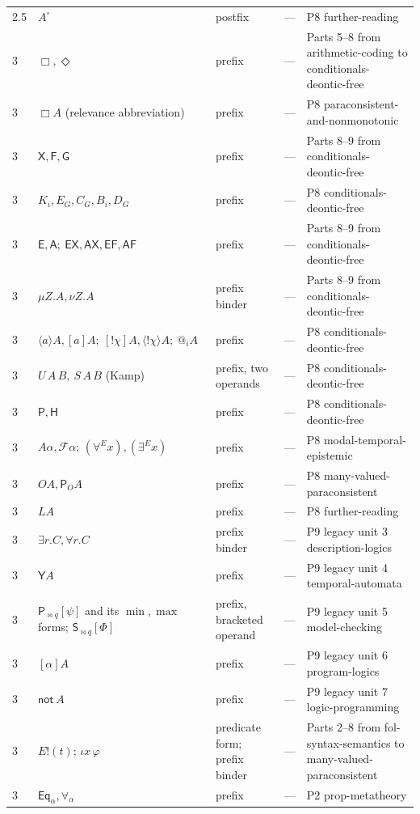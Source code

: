 \begin{longtable}{@{}p{}p{}p{}p{}p{}@{}}
2.5 & \(A^\circ\) & postfix & --- & P8 further-reading \\
3 & \(\Box,\Diamond\) & prefix & --- & Parts 5--8 from arithmetic-coding to conditionals-deontic-free \\
3 & \(\Box A\) (relevance abbreviation) & prefix & --- & P8 paraconsistent-and-nonmonotonic \\
3 & \(\mathsf X,\mathsf F,\mathsf G\) & prefix & --- & Parts 8--9 from conditionals-deontic-free \\
3 & \(K_i,E_G,C_G,B_i,D_G\) & prefix & --- & P8 conditionals-deontic-free \\
3 & \(\mathsf E,\mathsf A;\ \mathsf{EX},\mathsf{AX},\mathsf{EF},\mathsf{AF}\) & prefix & --- & Parts 8--9 from conditionals-deontic-free \\
3 & \(\mu Z.A,\nu Z.A\) & prefix binder & --- & Parts 8--9 from conditionals-deontic-free \\
3 & \(\langle a\rangle A,[a]A;\ [!\chi]A,\langle!\chi\rangle A;\ @_iA\) & prefix & --- & P8 conditionals-deontic-free \\
3 & \(U\,A\,B,\ S\,A\,B\) (Kamp) & prefix, two operands & --- & P8 conditionals-deontic-free \\
3 & \(\mathsf P,\mathsf H\) & prefix & --- & P8 conditionals-deontic-free \\
3 & \(A\alpha,\mathcal F\alpha\); \((\forall^E x),(\exists^E x)\) & prefix & --- & P8 modal-temporal-epistemic \\
3 & \(O A,\mathsf P_OA\) & prefix & --- & P8 many-valued-paraconsistent \\
3 & \(LA\) & prefix & --- & P8 further-reading \\
3 & \(\exists r.C,\forall r.C\) & prefix binder & --- & P9 legacy unit 3 description-logics \\
3 & \(\mathsf Y A\) & prefix & --- & P9 legacy unit 4 temporal-automata \\
3 & \(\mathsf P_{\bowtie q}[\psi]\) and its \(\min,\max\) forms; \(\mathsf S_{\bowtie q}[\Phi]\) & prefix, bracketed operand & --- & P9 legacy unit 5 model-checking \\
3 & \([\alpha]A\) & prefix & --- & P9 legacy unit 6 program-logics \\
3 & \(\mathsf{not}\ A\) & prefix & --- & P9 legacy unit 7 logic-programming \\
3 & \(E!(t)\); \(\iota x\,\varphi\) & predicate form; prefix binder & --- & Parts 2--8 from fol-syntax-semantics to many-valued-paraconsistent \\
3 & \(\mathsf{Eq}_{\alpha},\forall_{\alpha}\) & prefix & --- & P2 prop-metatheory \\

\end{longtable}
